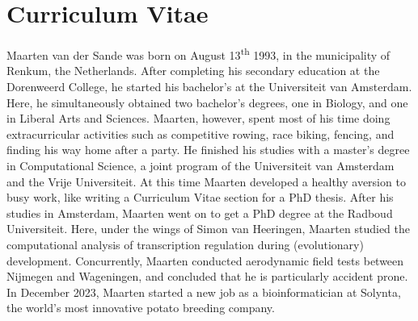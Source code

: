 \section{Curriculum Vitae}

Maarten van der Sande was born on August 13\textsuperscript{th} 1993, in the municipality of Renkum, the Netherlands. After completing his secondary education at the Dorenweerd College, he started his bachelor's at the Universiteit van Amsterdam. Here, he simultaneously obtained two bachelor's degrees, one in Biology, and one in Liberal Arts and Sciences. Maarten, however, spent most of his time doing extracurricular activities such as competitive rowing, race biking, fencing, and finding his way home after a party. He finished his studies with a master's degree in Computational Science, a joint program of the Universiteit van Amsterdam and the Vrije Universiteit. At this time Maarten developed a healthy aversion to busy work, like writing a Curriculum Vitae section for a PhD thesis. After his studies in Amsterdam, Maarten went on to get a PhD degree at the Radboud Universiteit. Here, under the wings of Simon van Heeringen, Maarten studied the computational analysis of transcription regulation during (evolutionary) development. Concurrently, Maarten conducted aerodynamic field tests between Nijmegen and Wageningen, and concluded that he is particularly accident prone. In December 2023, Maarten started a new job as a bioinformatician at Solynta, the world's most innovative potato breeding company.
